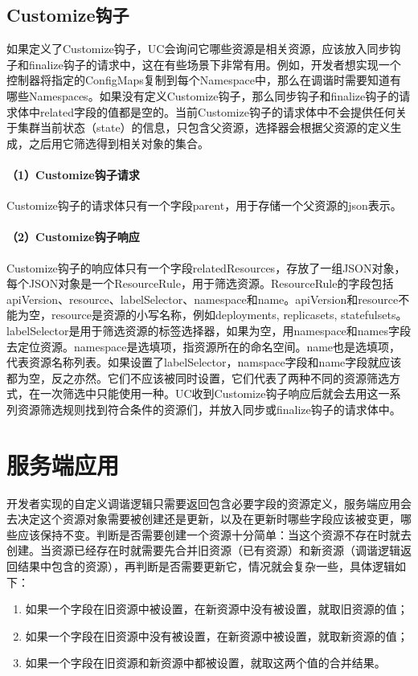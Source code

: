 \documentclass[macfonts,master]{njuthesis}
\begin{document}
\subsection{Customize钩子}

如果定义了Customize钩子，UC会询问它哪些资源是相关资源，应该放入同步钩子和finalize钩子的请求中，这在有些场景下非常有用。例如，开发者想实现一个控制器将指定的ConfigMaps复制到每个Namespace中，那么在调谐时需要知道有哪些Namespaces。如果没有定义Customize钩子，那么同步钩子和finalize钩子的请求体中related字段的值都是空的。当前Customize钩子的请求体中不会提供任何关于集群当前状态（state）的信息，只包含父资源，选择器会根据父资源的定义生成，之后用它筛选得到相关对象的集合。

\paragraph{（1）Customize钩子请求}
Customize钩子的请求体只有一个字段parent，用于存储一个父资源的json表示。
\paragraph{（2）Customize钩子响应}
Customize钩子的响应体只有一个字段relatedResources，存放了一组JSON对象，每个JSON对象是一个ResourceRule，用于筛选资源。ResourceRule的字段包括apiVersion、resource、labelSelector、namespace和name。apiVersion和resource不能为空，resource是资源的小写名称，例如deployments, replicasets, statefulsets。labelSelector是用于筛选资源的标签选择器，如果为空，用namespace和names字段去定位资源。namespace是选填项，指资源所在的命名空间。name也是选填项，代表资源名称列表。如果设置了labelSelector，namspace字段和name字段就应该都为空，反之亦然。它们不应该被同时设置，它们代表了两种不同的资源筛选方式，在一次筛选中只能使用一种。UC收到Customize钩子响应后就会去用这一系列资源筛选规则找到符合条件的资源们，并放入同步或finalize钩子的请求体中。

\section{服务端应用}

开发者实现的自定义调谐逻辑只需要返回包含必要字段的资源定义，服务端应用会去决定这个资源对象需要被创建还是更新，以及在更新时哪些字段应该被变更，哪些应该保持不变。判断是否需要创建一个资源十分简单：当这个资源不存在时就去创建。当资源已经存在时就需要先合并旧资源（已有资源）和新资源（调谐逻辑返回结果中包含的资源），再判断是否需要更新它，情况就会复杂一些，具体逻辑如下：

\begin{enumerate}
	\item 如果一个字段在旧资源中被设置，在新资源中没有被设置，就取旧资源的值；
	\item 如果一个字段在旧资源中没有被设置，在新资源中被设置，就取新资源的值；
	\item 如果一个字段在旧资源和新资源中都被设置，就取这两个值的合并结果。
\end{enumerate}
\end{document}
